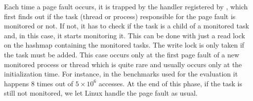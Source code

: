 

Each time a page fault occurs, it is trapped by the handler registered by
\Moca, which
first finds out if the task
(thread or process) responsible for the page fault is
monitored or not. If not, it has to check if the task is a child of a monitored
task and, in this case, it starts monitoring it. This can be done with just a
read lock on the hashmap containing the monitored tasks. The write lock is
only taken if the task must be added.
This case occurs only at the first page fault of a new monitored
process or thread which is quite rare and usually occurs only at the
initialization time. For instance, in the benchmarks used for
the evaluation it happens $8$ times out of $5\times10^6$ accesses.
At the end of this phase, if the task is still not monitored, we let Linux handle the page fault as usual.

